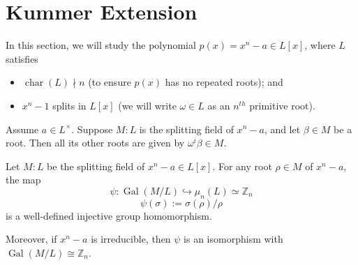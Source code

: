 \section{Kummer Extension}
In this section, we will study the polynomial $p(x)=x^n-a \in L[x]$, where $L$ satisfies 
\begin{itemize}
    \item $\operatorname{char}(L) \nmid n$ (to ensure $p(x)$ has no repeated roots); and
    \item $x^n-1$ splits in $L[x]$ (we will write $\omega \in L$ as an $n^{th}$ primitive root).
\end{itemize}
Assume $a\in L^\times$. Suppose $M:L$ is the splitting field of $x^n-a$, and let $\beta\in M$ be a root. Then all its other roots are given by $\omega^i\beta \in M$.
\begin{lemma} \label{lem-kummer}
    Let $M:L$ be the splitting field of $x^n-a\in L[x]$. For any root $\rho \in M$ of $x^n-a$, the map 
    $$\psi: \operatorname{Gal}(M/L) \hookrightarrow \mu_n(L)\simeq \mathbb{Z}_n$$ 
$$\psi(\sigma):=\sigma(\rho)/\rho  $$  
is a well-defined injective group homomorphism.

Moreover, if $x^n-a$ is irreducible, then $\psi$ is an isomorphism with $\operatorname{Gal}(M/L) \cong \mathbb{Z}_n$.
\end{lemma}
